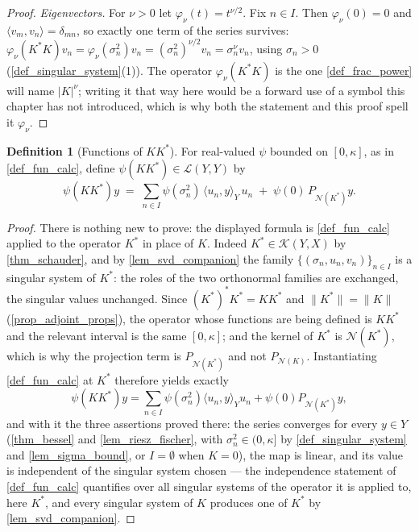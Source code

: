 \documentclass[a4paper]{report}
\theoremstyle{plain}
\theoremstyle{definition}
\newtheorem{definition}[theorem]{Definition}
\theoremstyle{remark}
\begin{document}
\begin{proof}
  \emph{Eigenvectors.}  For $\nu > 0$ let $\varphi_\nu(t) = t^{\nu/2}$.  Fix $n \in I$.
  Then $\varphi_\nu(0) = 0$ and $\langle v_m,v_n\rangle = \delta_{mn}$, so exactly one term
  of the series survives:
  $\varphi_\nu(K^*K)v_n = \varphi_\nu(\sigma_n^2)v_n = (\sigma_n^2)^{\nu/2}v_n
    = \sigma_n^\nu v_n$,
  using $\sigma_n > 0$ (\cref{def_singular_system}(1)).  The operator $\varphi_\nu(K^*K)$
  is the one \cref{def_frac_power} will name $|K|^\nu$; writing it that way here would be a
  forward use of a symbol this chapter has not introduced, which is why both the statement
  and this proof spell it $\varphi_\nu$.
\end{proof}




\begin{definition}[Functions of $KK^*$]
  \label{def_fun_calc_y}
  For real-valued $\psi$ bounded on $[0,\kappa]$, as in \cref{def_fun_calc}, define
  $\psi(KK^*) \in \mathcal{L}(Y,Y)$ by
  \[
    \psi(KK^*)y \;=\; \sum_{n \in I} \psi(\sigma_n^2)\,\langle u_n,y\rangle_Y\,u_n
      \;+\; \psi(0)\,P_{\mathcal{N}(K^*)}y .
  \]
\end{definition}
\begin{proof}
  There is nothing new to prove: the displayed formula is \cref{def_fun_calc} applied to
  the operator $K^*$ in place of $K$.  Indeed $K^* \in \mathcal{K}(Y,X)$ by
  \cref{thm_schauder}, and by \cref{lem_svd_companion} the family
  $\{(\sigma_n,u_n,v_n)\}_{n\in I}$ is a singular system of $K^*$: the roles of the two
  orthonormal families are exchanged, the singular values unchanged.  Since
  $(K^*)^*K^* = KK^*$ and $\|K^*\| = \|K\|$ (\cref{prop_adjoint_props}), the operator whose
  functions are being defined is $KK^*$ and the relevant interval is the same $[0,\kappa]$;
  and the kernel of $K^*$ is $\mathcal{N}(K^*)$, which is why the projection term is
  $P_{\mathcal{N}(K^*)}$ and not $P_{\mathcal{N}(K)}$.  Instantiating \cref{def_fun_calc}
  at $K^*$ therefore yields exactly
  \[
    \psi(KK^*)y = \sum_{n\in I}\psi(\sigma_n^2)\langle u_n,y\rangle_Y u_n
      + \psi(0)P_{\mathcal{N}(K^*)}y ,
  \]
  and with it the three assertions proved there: the series converges for every $y \in Y$
  (\cref{thm_bessel} and \cref{lem_riesz_fischer}, with $\sigma_n^2 \in (0,\kappa]$ by
  \cref{def_singular_system} and \cref{lem_sigma_bound}, or $I = \emptyset$ when
  $K = 0$), the map is linear, and its value
  is independent of the singular system chosen --- the independence statement of
  \cref{def_fun_calc} quantifies over all singular systems of the operator it is applied
  to, here $K^*$, and every singular system of $K$ produces one of $K^*$ by
  \cref{lem_svd_companion}.
\end{proof}
\end{document}
